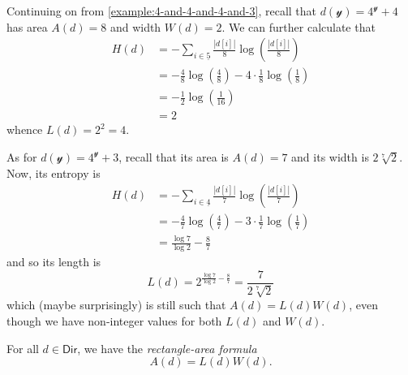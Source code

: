 \documentclass[11pt,fleqn]{article}
\newcommand{\yon}{\mathcal{y}}
\newcommand{\rig}[1]{\mathsf{#1}}
\newcommand{\Dir}{\rig{Dir}}
\begin{document}
\begin{example}
  Continuing on from \cref{example:4-and-4-and-4-and-3}, recall that $d(\yon)=4^\yon+4$ has area $A(d)=8$ and width $W(d)=2$.
  We can further calculate that
  \[
    \begin{aligned}
      H(d)
      &= -\sum_{i\in\underline{5}}\frac{|d[i]|}{8}\log\left(\frac{|d[i]|}{8}\right)
    \\&= -\frac{4}{8}\log\left(\frac{4}{8}\right) - 4\cdot\frac{1}{8}\log\left(\frac{1}{8}\right)
    \\&= -\frac{1}{2}\log\left(\frac{1}{16}\right)
    \\&= 2
    \end{aligned}
  \]
  whence $L(d) = 2^2 = 4$.

  \medskip

  As for $d(\yon)=4^\yon+3$, recall that its area is $A(d)=7$ and its width is $2\sqrt[7]{2}$.
  Now, its entropy is
  \[
    \begin{aligned}
      H(d)
      &= -\sum_{i\in\underline{4}}\frac{|d[i]|}{7}\log\left(\frac{|d[i]|}{7}\right)
    \\&= -\frac{4}{7}\log\left(\frac{4}{7}\right) - 3\cdot\frac{1}{7}\log\left(\frac{1}{7}\right)
    \\&= \frac{\log7}{\log2} - \frac{8}{7}
    \end{aligned}
  \]
  and so its length is
  \[
    L(d) = 2^{\frac{\log7}{\log2} - \frac{8}{7}} = \frac{7}{2\sqrt[7]{2}}
  \]
  which (maybe surprisingly) is still such that $A(d)=L(d)W(d)$, even though we have non-integer values for both $L(d)$ and $W(d)$.
\end{example}

\begin{theorem}
\label{theorem:rectangle-area-formula}
  For all $d\in\Dir$, we have the \emph{rectangle-area formula}
  \[
    A(d) = L(d)W(d).
  \]
\end{theorem}
\end{document}
